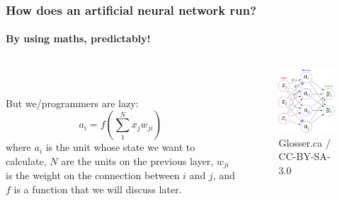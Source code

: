 \documentclass{beamer}
\begin{document}
\begin{frame}
\frametitle{How does an artificial neural network run?}
\framesubtitle{By using maths, predictably!}
  \begin{columns}[T]
    \begin{column}{.5\textwidth}
     \ \\
     \ \\
     
But we/programmers are lazy:
\begin{equation*}
a_i = f \left( \sum_1^N x_j w_{ji} \right)
\end{equation*}
where $a_i$ is the unit whose state we want to calculate, $N$ are the units on the previous layer, $w_{ji}$ is the weight on the connection between $i$ and $j$, and $f$ is a function that we will discuss later.

    \end{column}
    \begin{column}{.5\textwidth}
	\begin{figure}
	\centering
	\includegraphics[width=\linewidth]{./fig/3-layer_maths.pdf}
	  \caption{Glosser.ca / CC-BY-SA-3.0}
	\end{figure}
    \end{column}
  \end{columns}
\end{frame}
\end{document}
